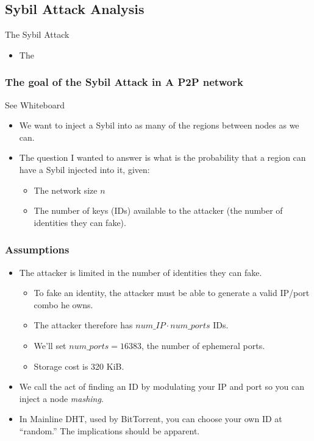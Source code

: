 \documentclass[11pt]{beamer}
\begin{document}
\subsection{Sybil Attack Analysis}

\begin{frame}{The Sybil Attack}
	\begin{itemize}
		\item The 
	\end{itemize}
\end{frame}



\begin{frame}
	\frametitle{The goal of the Sybil Attack in A P2P network}
	See Whiteboard
	\begin{itemize}
		\item We want to inject a Sybil into as many of the regions between nodes as we can.
		\item The question I wanted to answer is what is the probability that a region can have a Sybil injected into it, given:
		\begin{itemize}
			\item The network size $n$
			\item The number of keys (IDs) available to the attacker (the number of identities they can fake).
		\end{itemize}
	\end{itemize}
	\end{frame} 
       
\begin{frame}
\frametitle{Assumptions}
	\begin{itemize}
		\item The attacker is limited in the number of identities they can fake.
		
		\begin{itemize}
			\item To fake an identity, the attacker must be able to generate a valid IP/port combo he owns.
			\item The attacker therefore has $num\_IP \cdot num\_ports$ IDs.
			\item We'll set $ num\_ports = 16383 $, the number of ephemeral ports.
			\item Storage cost is 320 KiB.
		\end{itemize}
		\item We call the act of finding an ID by modulating your IP and port so you can inject a node \emph{mashing}.
		\item In Mainline DHT, used by BitTorrent, you can choose your own ID at ``random.''   The implications should be apparent.
	
	\end{itemize}
\end{frame}
\end{document}
